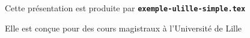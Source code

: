   \item Cette présentation est produite par \texttt{\textbf{exemple-ulille-simple.tex}}
  \item Elle est conçue pour des cours magistraux à l'Université de Lille
